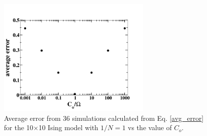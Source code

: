 \documentclass[aps,pre,reprint,superscriptaddress,showkeys]{revtex4-1}
\begin{document}
\begin{figure}[h!]
\includegraphics[width=7.5cm]{./figures/optimalCo.png}
\caption{Average error from 36 simulations calculated from Eq. \ref{avg_error} for the 10$\times$10 Ising model with $1/N=1$ vs the value of $C_{o}$.  \label{optimalCo}}
\end{figure}
\end{document}
